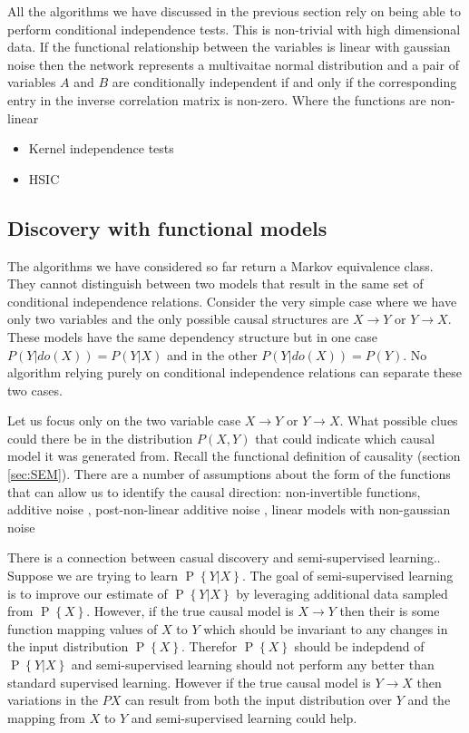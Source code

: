 \documentclass[11pt,a4paper,oneside]{book}
\renewcommand{\P}[1]{\operatorname{P}\left\{#1\right\}}
\begin{document}
All the algorithms we have discussed in the previous section rely on being able to perform conditional independence tests. This is non-trivial with high dimensional data. If the functional relationship between the variables is linear with gaussian noise then the network represents a multivaitae normal distribution and a pair of variables $A$ and $B$ are conditionally independent if and only if the corresponding entry in the inverse correlation matrix is non-zero. Where the functions are non-linear 

\begin{itemize}
\item \cite{Zhang2012} Kernel independence tests
\item HSIC \cite{Gretton2008}
\end{itemize}

\subsection*{Discovery with functional models}
The algorithms we have considered so far return a Markov equivalence class. They cannot distinguish between two models that result in the same set of conditional independence relations. Consider the very simple case where we have only two variables and the only possible causal structures are $X \rightarrow Y$ or $Y \rightarrow X$. These models have the same dependency structure but in one case $P(Y|do(X)) = P(Y|X)$ and in the other $P(Y|do(X)) = P(Y)$. No algorithm relying purely on conditional independence relations can separate these two cases. 

Let us focus only on the two variable case $X \rightarrow Y$ or $Y \rightarrow X$. What possible clues could there be in the distribution $P(X,Y)$ that could indicate which causal model it was generated from. Recall the functional definition of causality (section \ref{sec:SEM}). There are a number of assumptions about the form of the functions that can allow us to identify the causal direction: non-invertible functions, additive noise \cite{Hoyer2009}, post-non-linear additive noise \cite{Zhang2008a}, linear models with non-gaussian noise \cite{Hoyer2012}

There is a connection between casual discovery and semi-supervised learning.\cite{causal anti causal}. Suppose we are trying to learn $\P{Y|X}$. The goal of semi-supervised learning is to improve our estimate of $\P{Y|X}$ by leveraging additional data sampled from $\P{X}$. However, if the true causal model is $X \rightarrow Y$ then their is some function mapping values of $X$ to $Y$ which should be invariant to any changes in the input distribution $\P{X}$. Therefor $\P{X}$ should be indepdend of $\P{Y|X}$ and semi-supervised learning should not perform any better than standard supervised learning. However if the true causal model is $Y \rightarrow X$ then variations in the $P{X}$ can result from both the input distribution over $Y$ and the mapping from $X$ to $Y$ and semi-supervised learning could help.
\end{document}
